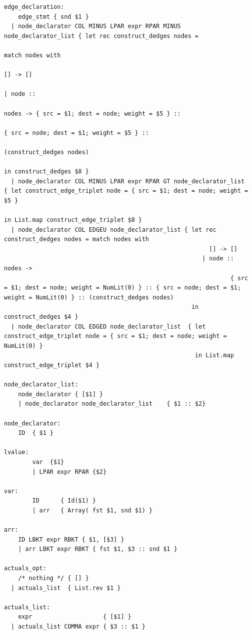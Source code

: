 \documentclass[a4paper,12pt]{article}
\begin{document}
\begin{lstlisting}
edge_declaration:
    edge_stmt { snd $1 }
  | node_declarator COL MINUS LPAR expr RPAR MINUS node_declarator_list { let rec construct_dedges nodes =
                                                                            match nodes with
                                                                              [] -> []
                                                                            | node ::
                                                                                nodes -> { src = $1; dest = node; weight = $5 } ::
                                                                                         { src = node; dest = $1; weight = $5 } ::
                                                                                         (construct_dedges nodes)
                                                                          in construct_dedges $8 }
  | node_declarator COL MINUS LPAR expr RPAR GT node_declarator_list  { let construct_edge_triplet node = { src = $1; dest = node; weight = $5 }
                                                                        in List.map construct_edge_triplet $8 }
  | node_declarator COL EDGEU node_declarator_list { let rec construct_dedges nodes = match nodes with
                                                          [] -> []
                                                        | node :: nodes -> 
                                                                { src = $1; dest = node; weight = NumLit(0) } :: { src = node; dest = $1; weight = NumLit(0) } :: (construct_dedges nodes)
                                                     in construct_dedges $4 }
  | node_declarator COL EDGED node_declarator_list  { let construct_edge_triplet node = { src = $1; dest = node; weight = NumLit(0) }
                                                      in List.map construct_edge_triplet $4 }

node_declarator_list:
    node_declarator { [$1] }
    | node_declarator node_declarator_list    { $1 :: $2}
                                                       
node_declarator:
    ID  { $1 }

lvalue:
        var  {$1}
        | LPAR expr RPAR {$2}

var:
        ID      { Id($1) }
        | arr   { Array( fst $1, snd $1) }

arr:
    ID LBKT expr RBKT { $1, [$3] }
    | arr LBKT expr RBKT { fst $1, $3 :: snd $1 }

actuals_opt:
    /* nothing */ { [] }
  | actuals_list  { List.rev $1 }

actuals_list:
    expr                    { [$1] }
  | actuals_list COMMA expr { $3 :: $1 }
\end{lstlisting}
\end{document}
